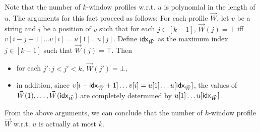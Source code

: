 Note that the number of $k$-window profiles w.r.t. $u$ is polynomial in the length of $u$. The arguments for this fact proceed as follows: For each profile $\vec{W}$, let $v$ be a string and $i$ be a position of $v$ such that for each $j \in [k-1]$, $\vec{W}(j) = \top$ iff $v[i-j+1] \dots v[i] = u[1] \dots u[j]$. Define ${\sf idx}_{\vec{W}}$ as the maximum index $j \in [k-1]$ such that $\vec{W}(j)=\top$. Then 
\begin{itemize}
	\item for each $j': j < j' < k$, $\vec{W}(j')=\bot$, 
	\item in addition, since $v[i-{\sf idx}_{\vec{W}}+1] \dots v[i] = u[1] \dots u[{\sf idx}_{\vec{W}}]$, the values of $\vec{W}(1),\dots, \vec{W}({\sf idx}_{\vec{W}})$ are completely determined by $u[1] \dots u[{\sf idx}_{\vec{W}}]$.
\end{itemize}
From the above arguments, we can  conclude that the number of $k$-window profile $\vec{W}$ w.r.t. $u$ is actually at most $k$.

\smallskip

